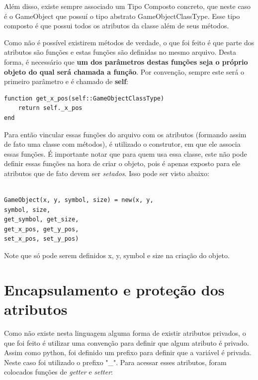 \documentclass[rel_mlp]{iiufrgs}
\begin{document}
Além disso, existe sempre associado um Tipo Composto concreto, que neste caso é o GameObject que possuí o tipo abstrato GameObjectClassType. Esse tipo composto é que possui todos os atributos da classe além de seus métodos.

Como não é possível existirem métodos de verdade, o que foi feito é que parte dos atributos são funções e estas funções são definidas no mesmo arquivo. Desta forma, é necessário que \textbf{um dos parâmetros destas funções seja o próprio objeto do qual será chamada a função}. Por convenção, sempre este será o primeiro parâmetro e é chamado de \textbf{self}:

\begin{lstlisting}[frame=single]
function get_x_pos(self::GameObjectClassType)
	return self._x_pos
end
\end{lstlisting}



Para então vincular essas funções do arquivo com os atributos (formando assim de fato uma classe com métodos), é utilizado o construtor, em que ele associa essas funções. É importante notar que para quem usa essa classe, este não pode definir essas funções na hora de criar o objeto, pois é apenas exposto para ele atributos que de fato devem ser \textit{setados}. Isso pode ser visto abaixo:

\begin{lstlisting}[frame=single]

GameObject(x, y, symbol, size) = new(x, y, 
symbol, size,
get_symbol, get_size,
get_x_pos, get_y_pos,
set_x_pos, set_y_pos)

\end{lstlisting}

Note que só pode serem definidos x, y, symbol e size na criação do objeto.


\section{Encapsulamento e proteção dos atributos}

Como não existe nesta linguagem alguma forma de existir atributos privados, o que foi feito é utilizar uma convenção para definir que algum atributo é privado. Assim como python, foi definido um prefixo para definir que a variável é privada. Neste caso foi utilizado o prefixo "\_". Para acessar esses atributos, foram colocados funções de \textit{getter} e \textit{setter}:
\end{document}
